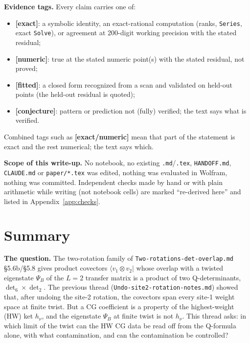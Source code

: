 \documentclass[10pt]{article}
\newcommand{\nb}[1]{\texttt{#1}}
\begin{document}
\textbf{Evidence tags.} Every claim carries one of:

\begin{itemize}\setlength{\itemsep}{1pt}
\item \textbf{[exact]}: a symbolic identity, an exact-rational computation (ranks, \nb{Series}, exact \nb{Solve}), or agreement at 200-digit working precision with the stated residual;
\item \textbf{[numeric]}: true at the stated numeric point(s) with the stated residual, not proved;
\item \textbf{[fitted]}: a closed form recognized from a scan and validated on held-out points (the held-out residual is quoted);
\item \textbf{[conjecture]}: pattern or prediction not (fully) verified; the text says what is verified.
\end{itemize}

Combined tags such as \textbf{[exact/numeric]} mean that part of the statement is exact and the rest numerical; the text says which.

\textbf{Scope of this write-up.} No notebook, no existing \nb{.\allowbreak{}md}/\nb{.\allowbreak{}tex}, \nb{HANDOFF.\allowbreak{}md}, \nb{CLAUDE.\allowbreak{}md} or \nb{paper/\allowbreak{}*.\allowbreak{}tex} was edited, nothing was evaluated in Wolfram, nothing was committed. Independent checks made by hand or with plain arithmetic while writing (not notebook cells) are marked ``re-derived here'' and listed in Appendix~\ref{app:checks}.

\section{Summary}\label{sec:summary}

\textbf{The question.} The two-rotation family of \nb{Two-\allowbreak{}rotations-\allowbreak{}det-\allowbreak{}overlap.\allowbreak{}md} \S{}5.6b/\S{}5.8 gives product covectors $\langle v_1\otimes v_2|$ whose overlap with a twisted eigenstate $\Psi_B$ of the $L=2$ transfer matrix is a product of two Q-determinants, $\det_6\times\det_2$. The previous thread (\nb{Undo-\allowbreak{}site2-\allowbreak{}rotation-\allowbreak{}notes.\allowbreak{}md}) showed that, after undoing the site-2 rotation, the covectors span every site-1 weight space at finite twist. But a CG coefficient is a property of the highest-weight (HW) ket $h_\nu$, and the eigenstate $\Psi_B$ at finite twist is not $h_\nu$. This thread asks: in which limit of the twist can the HW CG data be read off from the Q-formula alone, with what contamination, and can the contamination be controlled?
\end{document}
